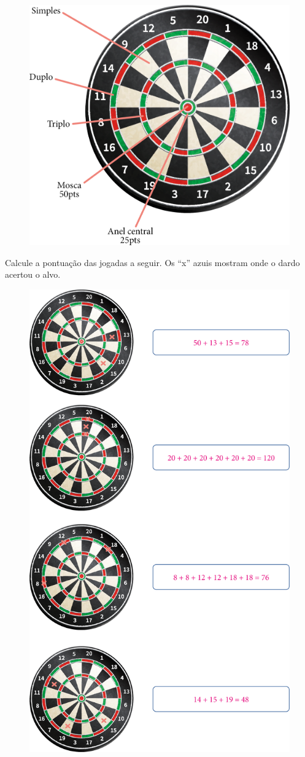 \begin{figure}[htpb!]
\centering
\includegraphics[width=.6\textwidth]{./media/image24.png}
\end{figure}


\pagebreak
Calcule a pontuação das jogadas a seguir. Os ``x'' azuis mostram onde o dardo acertou o alvo.


\begin{figure}[htpb!]
\includegraphics[width=.7\textwidth]{./media/image25.png}
\end{figure}

